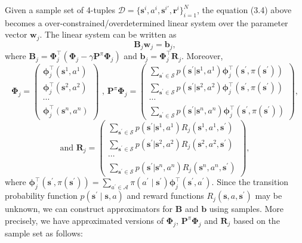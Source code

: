\documentclass{article}
\newcommand{\itl}{\intercal}
\newcommand{\p}{\prime}
\newcommand{\bs}{ \boldsymbol}
\newcommand{\ml}{\mathcal}
\begin{document}
Given a sample set of 4-tuples $\bs{\mathcal{D}} = \{\bs{s}^{i}, a^{i}, \bs{s}^{i\prime}, \bs{r}^i\}_{i=1}^N$, the equation (3.4) above becomes a over-constrained/overdetermined linear system over the parameter vector $\bs{w}_j$. The linear system can be written as
$$\bs{B}_j\bs{w}_j = \bs{b}_j,$$
where $\bs{B}_j = \bs{\Phi}_j^{\itl}(\bs{\Phi}_j - \gamma \bs{P}^{\pi}\bs{\Phi}_j )$ and $\bs{b}_j =\bs{\Phi}_j^{\intercal} \bs{R}_j$. Moreover,
$$\bs{\Phi}_j = \begin{pmatrix}
\bs{\phi}_j^\intercal(\bs{s}^1,a^1)  \\
\bs{\phi}_j^\intercal(\bs{s}^2,a^2) \\
\cdots\\
\bs{\phi}_j^\intercal(\bs{s}^n,a^n) \end{pmatrix}
\text{ , } 
\bs{P}^{\pi}\bs{\Phi}_j = \begin{pmatrix}
\sum_{\bs{s}^{\prime} \in \bs{\ml{S}}}  p(\bs{s}^{\prime} | \bs{s}^1, a^1)\bs{\phi}_j^\intercal(\bs{s}^{\prime},\pi(\bs{s}^{\prime})) \\
\sum_{\bs{s}^{\prime} \in \bs{\ml{S}}}  p(\bs{s}^{\prime} | \bs{s}^2, a^2)\bs{\phi}_j^\intercal(\bs{s}^{\prime},\pi(\bs{s}^{\prime})) \\
\cdots\\
\sum_{\bs{s}^{\prime} \in \bs{\ml{S}}}  p(\bs{s}^{\prime} | \bs{s}^n, a^n)\bs{\phi}_j^\intercal(\bs{s}^{\prime},\pi(\bs{s}^{\prime})) \end{pmatrix},$$
$$\text{and } \bs{R}_j=  \begin{pmatrix} \sum_{\bs{s}^{\prime} \in \bs{\ml{S}}}  p(\bs{s}^{\prime} | \bs{s}^1, a^1) R_j(\bs{s}^1, a^1, \bs{s}^{\prime}) \\
\sum_{\bs{s}^{\prime} \in \bs{\ml{S}}}  p(\bs{s}^{\prime} | \bs{s}^2, a^2) R_j(\bs{s}^2, a^2, \bs{s}^{\prime}) \\
\cdots \\
\sum_{\bs{s}^{\prime} \in \bs{\ml{S}}}  p(\bs{s}^{\prime} | \bs{s}^n, a^n) R_j(\bs{s}^n, a^n, \bs{s}^{\prime})\end{pmatrix},$$
where $\bs{\phi}_j^\intercal(\bs{s}^{\prime},\pi(\bs{s}^{\prime})) = \sum_{a^{\p} \in \ml{A}} \pi(a^{\prime} \mid \bs{s}^{\p} )  \bs{\phi}_j^\intercal(\bs{s}^{\prime}, a^{\prime}).$
Since the transition probability function $p(\bs{s}^{\prime} \mid \bs{s}, a)$ and reward functions $R_j(\bs{s}, a, \bs{s}^{\p})$ may be unknown,  we can construct approximators for $\bs{B}$ and $\bs{b}$ using samples. More precisely, we have approximated versions of $\bs{\Phi}_j$, $\bs{P}^{\pi}\bs{\Phi}_j$ and $\bs{R}_j$ based on the sample set as follows:
\end{document}
